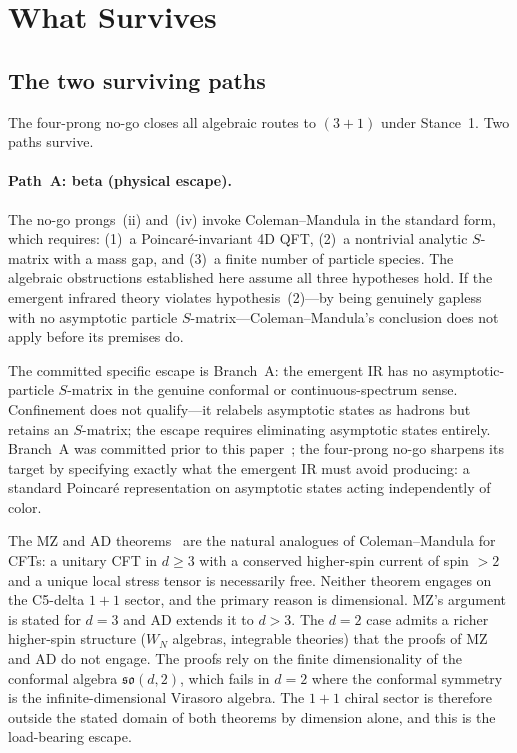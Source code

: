 \documentclass[aip,jmp,amsmath,amssymb,reprint,author-year]{revtex4-2}
\begin{document}
\section{What Survives}
\label{sec:survives}

\subsection{The two surviving paths}

The four-prong no-go closes all algebraic routes to $(3{+}1)$ under
Stance~1.  Two paths survive.

\paragraph{Path~A: beta (physical escape).}
The no-go prongs~(ii) and~(iv) invoke Coleman--Mandula in the standard
form, which requires: (1)~a Poincar\'{e}-invariant 4D QFT, (2)~a
nontrivial analytic $S$-matrix with a mass gap, and (3)~a finite number
of particle species.  The algebraic obstructions established here assume
all three hypotheses hold.  If the emergent infrared theory violates
hypothesis~(2)---by being genuinely gapless with no asymptotic particle
$S$-matrix---Coleman--Mandula's conclusion does not apply before its
premises do.

The committed specific escape is Branch~A: the emergent IR has no
asymptotic-particle $S$-matrix in the genuine conformal or
continuous-spectrum sense.  Confinement does not qualify---it relabels
asymptotic states as hadrons but retains an $S$-matrix; the escape
requires eliminating asymptotic states entirely.  Branch~A was committed
prior to this paper~\citep{C5gamma}; the four-prong no-go sharpens its
target by specifying exactly what the emergent IR must avoid producing: a
standard Poincar\'{e} representation on asymptotic states acting
independently of color.

The MZ and AD
theorems~\citep{MaldacenaZhiboedov2011,AlbaDiab2015} are the natural
analogues of Coleman--Mandula for CFTs: a unitary CFT in $d \geq 3$ with
a conserved higher-spin current of spin $> 2$ and a unique local stress
tensor is necessarily free.  Neither theorem engages on the C5-delta
$1{+}1$ sector, and the primary reason is dimensional.  MZ's argument is
stated for $d = 3$ and AD extends it to $d > 3$.  The $d = 2$ case
admits a richer higher-spin structure ($W_N$ algebras, integrable
theories) that the proofs of MZ and AD do not engage.  The proofs rely
on the finite dimensionality of the conformal algebra
$\mathfrak{so}(d,2)$, which fails in $d = 2$ where the conformal
symmetry is the infinite-dimensional Virasoro algebra.  The $1{+}1$
chiral sector is therefore outside the stated domain of both theorems by
dimension alone, and this is the load-bearing escape.
\end{document}
